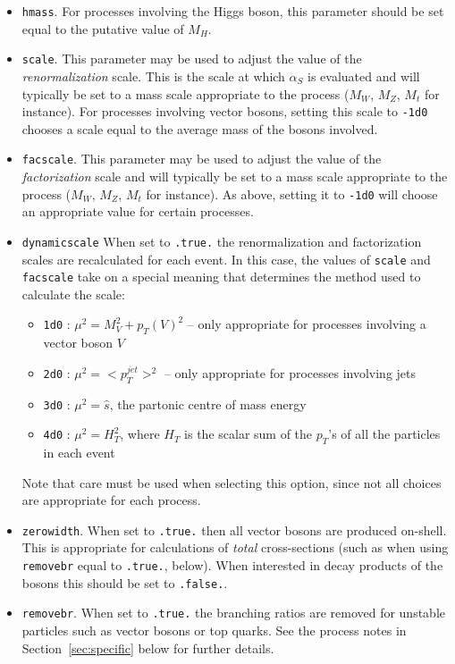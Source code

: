 \documentclass[12pt]{article}
\begin{document}
\begin{itemize}
\item {\tt hmass}. For processes involving the Higgs boson, this
parameter should be set equal to the putative value of $M_H$.

\item {\tt scale}. This parameter may be used to adjust the value
of the {\it renormalization} scale. This is the scale
at which $\alpha_S$ is evaluated and will typically be set to
a mass scale appropriate to the process ($M_W$, $M_Z$, $M_t$ for
instance). For processes involving vector bosons, setting this
scale to {\tt -1d0} chooses a scale equal to the average mass of
the bosons involved.

\item {\tt facscale}. This parameter may be used to adjust the value
of the {\it factorization} scale and will typically be set to
a mass scale appropriate to the process ($M_W$, $M_Z$, $M_t$ for
instance). As above, setting it to {\tt -1d0} will choose an
appropriate value for certain processes.

\item {\tt dynamicscale} When set to {\tt .true.} the renormalization and
factorization scales are recalculated for each event. In this case,
the values of {\tt scale} and {\tt facscale} take on a special meaning
that determines the method used to calculate the scale:
  \begin{itemize}
  \item {\tt 1d0} : $\mu^2 = M_V^2+p_T(V)^2$ -- only appropriate for
  processes involving a vector boson $V$
  \item {\tt 2d0} : $\mu^2 = <p_T^{jet}>^2$ -- only appropriate for
  processes involving jets
  \item {\tt 3d0} : $\mu^2 = \hat{s}$, the partonic centre of mass energy
  \item {\tt 4d0} : $\mu^2 = H_T^2$, where $H_T$ is the scalar sum of
  the $p_T$'s of all the particles in each event
  \end{itemize}
  Note that care must be used when selecting this option, since not
  all choices are appropriate for each process.

\item {\tt zerowidth}. When set to {\tt .true.} then all vector
bosons are produced on-shell. This is appropriate for calculations
of {\it total} cross-sections (such as when using {\tt removebr} equal
to {\tt .true.}, below). When interested in decay products of the
bosons this should be set to {\tt .false.}.

\item {\tt removebr}. When set to {\tt .true.} the branching ratios are 
removed for unstable particles such as vector bosons or top quarks. See the
process notes in Section~\ref{sec:specific} below for further details.


\end{itemize}
\end{document}
